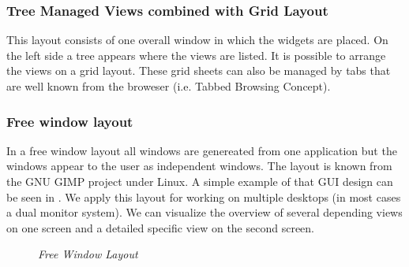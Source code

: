\subsubsection{Tree Managed Views combined with Grid Layout}

This layout consists of one overall window in which the widgets are placed. 
On the left side a tree appears where the views are listed. It is possible to arrange the views on a grid
layout. These grid sheets can also be managed by tabs that are well known from the broweser (i.e. Tabbed Browsing Concept).

\subsubsection{Free window layout}

In a free window layout all windows are genereated from one application but the windows appear to the user as independent windows.
The layout is known from the GNU GIMP project under Linux.
A simple example of that GUI design can be seen in .
We apply this layout for working on multiple desktops (in most cases a dual monitor system).
We can visualize the overview of several depending views on one screen and a detailed specific view on the second screen.

\begin{figure}[ht]
\centering 
{} 
\caption[Free Window Layout]{\textit{Free Window Layout}} 
\label{gfx:free_window_layout}
\end{figure}

